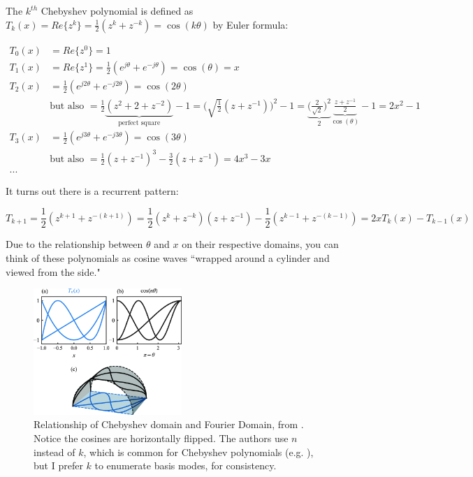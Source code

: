 \documentclass[10pt]{article}
\begin{document}
The $k^{th}$ Chebyshev polynomial is defined as $T_k(x) = Re\{z^k\} = \frac{1}{2}(z^k + z^{-k}) = \cos(k\theta)$ by Euler formula:

\begin{align*}
T_0(x) &= Re\{z^0\} = 1\\
T_1(x) &= Re\{z^1\} = \frac{1}{2}(e^{j\theta} + e^{-j\theta}) = \cos(\theta) = x\\
T_2(x) &= \frac{1}{2}(e^{j2\theta} + e^{-j2\theta}) = \cos(2\theta)\\
& \text{but also } = \frac{1}{2}\underbrace{(z^2 + 2 + z^{-2})}_{\text{perfect square}} - 1 = \Big( \sqrt{\frac{1}{2}} (z + z^{-1}) \Big)^2 - 1 = \underbrace{\Big( \frac{2}{\sqrt{2}} \Big)^2}_{2} \underbrace{\frac{z + z^{-1}}{2}}_{\cos(\theta)} - 1 = 2x^2 - 1\\
T_3(x) &= \frac{1}{2}(e^{j3\theta} + e^{-j3\theta}) = \cos(3\theta)\\
& \text{but also } = \frac{1}{2}(z + z^{-1})^3 - \frac{3}{2}(z + z^{-1}) = 4x^3 - 3x\\
...
\end{align*}

It turns out there is a recurrent pattern:

$$ T_{k+1} = \frac{1}{2}(z^{k+1} + z^{-(k+1)}) = \frac{1}{2}(z^k + z^{-k})(z + z^{-1}) - \frac{1}{2}(z^{k-1} + z^{-(k-1)}) = 2xT_k(x) - T_{k-1}(x) $$

Due to the relationship between $\theta$ and $x$ on their respective domains, you can think of these polynomials as cosine waves ``wrapped around a cylinder and viewed from the side."\cite{trefethen8}

\begin{figure}[h]\label{cylinder}
	\centering
	\includegraphics[width=0.5\textwidth]{cylinder.png}
	\captionsetup{width=0.65\textwidth}
	\caption*{Relationship of Chebyshev domain and Fourier Domain, from \cite{dedalus}. Notice the cosines are horizontally flipped. The authors use $n$ instead of $k$, which is common for Chebyshev polynomials (e.g. \cite{trefethen8}), but I prefer $k$ to enumerate basis modes, for consistency.}
\end{figure}
\end{document}
